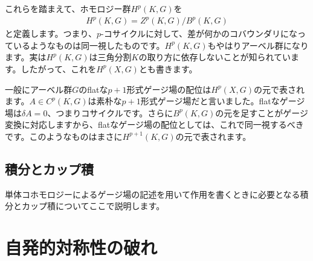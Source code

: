 \documentclass[generalized_symmetry.tex]{subfiles}
\begin{document}
これらを踏まえて、ホモロジー群$H^p(K,G)$を
\begin{align}
    H^p(K,G) = Z^p(K,G)/B^p(K,G)
\end{align}
と定義します。つまり、$p$-コサイクルに対して、差が何かのコバウンダリになっているようなものは同一視したものです。$H^p(K,G)$もやはりアーベル群になります。実は$H^p(K,G)$は三角分割$K$の取り方に依存しないことが知られています。したがって、これを$H^p(X,G)$とも書きます。

一般にアーベル群$G$のflatな$p+1$形式ゲージ場の配位は$H^p(X,G)$の元で表されます。$A \in C^{p}(K,G)$は素朴な$p+1$形式ゲージ場だと言いました。flatなゲージ場は$\delta A=0$、つまりコサイクルです。さらに$B^p(K,G)$の元を足すことがゲージ変換に対応しますから、flatなゲージ場の配位としては、これで同一視するべきです。このようなものはまさに$H^{p+1}(K,G)$の元で表されます。

\subsection{積分とカップ積}

単体コホモロジーによるゲージ場の記述を用いて作用を書くときに必要となる積分とカップ積についてここで説明します。


\section{自発的対称性の破れ}
\end{document}
